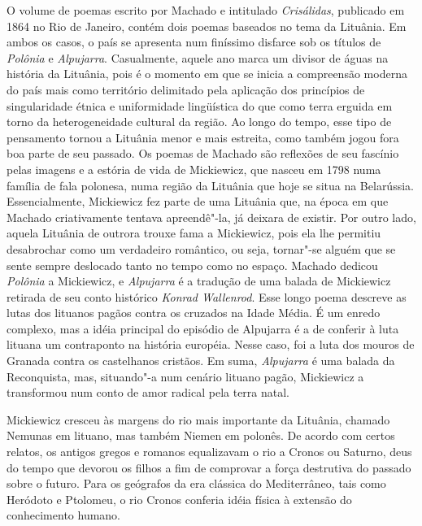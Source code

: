 {O volume de poemas escrito por Machado e intitulado \textit{Crisálidas},
publicado em 1864 no Rio de Janeiro, contém dois poemas baseados no tema
da Lituânia. Em ambos os casos, o país se apresenta num finíssimo
disfarce sob os títulos de \textit{Polônia} e \textit{Alpujarra}.
Casualmente, aquele ano marca um divisor de águas na história da
Lituânia, pois é o momento em que se inicia a compreensão moderna do
país mais como território delimitado pela aplicação dos princípios de
singularidade étnica e uniformidade lingüística do que como terra
erguida em torno da heterogeneidade cultural da região. Ao longo do
tempo, esse tipo de pensamento tornou a Lituânia menor e mais estreita,
como também jogou fora boa parte de seu passado. Os poemas de Machado
são reflexões de seu fascínio pelas imagens e a estória de vida de
Mickiewicz, que nasceu em 1798 numa família de fala polonesa, numa
região da Lituânia que hoje se situa na Belarússia. Essencialmente,
Mickiewicz fez parte de uma Lituânia que, na época em que Machado
criativamente tentava apreendê"-la, já deixara de existir. Por outro
lado, aquela Lituânia de outrora trouxe fama a Mickiewicz, pois ela lhe
permitiu desabrochar como um verdadeiro romântico, ou seja, tornar"-se
alguém que se sente sempre deslocado tanto no tempo como no espaço.
Machado dedicou \textit{Polônia} a Mickiewicz, e \textit{Alpujarra} é a
tradução de uma balada de Mickiewicz retirada de seu conto histórico
\textit{Konrad Wallenrod}. Esse longo poema descreve as lutas dos lituanos
pagãos contra os cruzados na Idade Média. É um enredo complexo, mas a
idéia principal do episódio de Alpujarra é a de conferir à luta lituana
um contraponto na história européia. Nesse caso, foi a luta dos mouros
de Granada contra os castelhanos cristãos. Em suma, \textit{Alpujarra} é
uma balada da Reconquista, mas, situando"-a num cenário lituano pagão,
Mickiewicz a transformou num conto de amor radical pela terra natal.

Mickiewicz cresceu às margens do rio mais importante da Lituânia,
chamado Nemunas em lituano, mas também Niemen em polonês. De acordo com
certos relatos, os antigos gregos e romanos equalizavam o rio a Cronos
ou Saturno, deus do tempo que devorou os filhos a fim de comprovar a
força destrutiva do passado sobre o futuro. Para os geógrafos da era
clássica do Mediterrâneo, tais como Heródoto e Ptolomeu, o rio Cronos
conferia idéia física à extensão do conhecimento humano.

}
